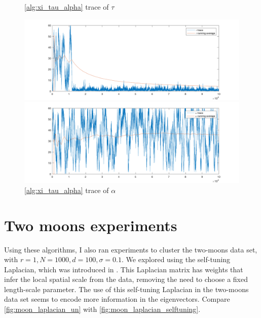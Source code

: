 \documentclass{siamart1116}
\begin{document}
\begin{figure}[!htb]
\begin{minipage}{0.48\textwidth}
    \caption{\label{fig:noncentered_voting_tau}\cref{alg:xi_tau_alpha} trace of $\tau$}
    \includegraphics[width=\linewidth]{voting/noncentered/trace_tau.png}
\end{minipage}\hfill
\begin{minipage}{0.48\textwidth}
    \caption{\label{fig:noncentered_voting_alpha} \cref{alg:xi_tau_alpha} trace of $\alpha$}
    \includegraphics[width=\linewidth]{voting/noncentered/trace_alpha.png}
\end{minipage}
\end{figure}

\section{Two moons experiments}

Using these algorithms, I also ran experiments to cluster the two-moons data set, with $r=1, N = 1000, d = 100, \sigma = 0.1$. We explored using the self-tuning Laplacian, which was introduced in \cite{SelfTuning}. This Laplacian matrix has weights that infer the local spatial scale from the data, removing the need to choose a fixed length-scale parameter. The use of this self-tuning Laplacian in the two-moons data set seems to encode more information in the eigenvectors. Compare \cref{fig:moon_laplacian_un} with \cref{fig:moon_laplacian_selftuning}. 
\end{document}
